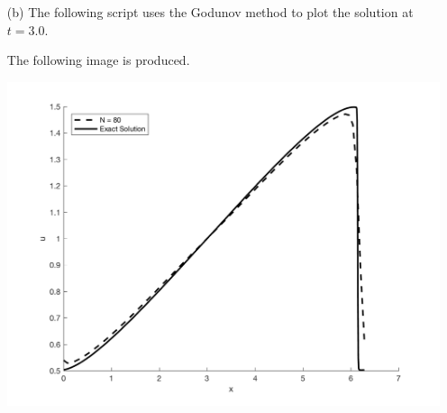 \documentclass[11pt, oneside]{article}
\begin{document}
\begin{enumerate}
\begin{enumerate}
      \item[(b)] %
        The following script uses the Godunov method to plot the solution
        at $t = 3.0$.
        
        The following image is produced.
        \begin{center}
          \includegraphics[scale=0.7]{Figures/05_01.png}
        \end{center}
    \end{enumerate}

\end{enumerate}
\end{document}
